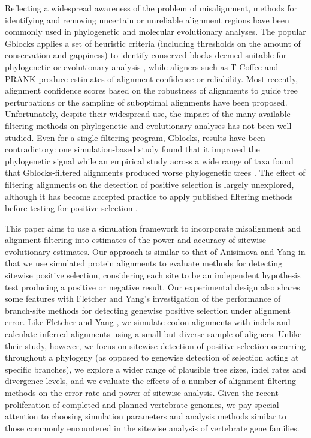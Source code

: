\documentclass{mbe}
\begin{document}
Reflecting a widespread awareness of the problem of misalignment,
methods for identifying and removing uncertain or unreliable alignment
regions have been commonly used in phylogenetic and molecular
evolutionary analyses. The popular Gblocks applies a set of heuristic
criteria (including thresholds on the amount of conservation and
gappiness) to identify conserved blocks deemed suitable for
phylogenetic or evolutionary analysis \citep{Castresana2000Selection},
while aligners such as T-Coffee \citep{Notredame2000TCoffee} and PRANK
\citep{Loytynoja2005From} produce estimates of alignment confidence or
reliability. Most recently, alignment confidence scores based on the
robustness of alignments to guide tree perturbations
\citep{Penn2010Alignment} or the sampling of suboptimal alignments
\citep{Kim2011PSAR} have been proposed. Unfortunately, despite their
widespread use, the impact of the many available filtering methods on
phylogenetic and evolutionary analyses has not been well-studied. Even
for a single filtering program, Gblocks, results have been
contradictory: one simulation-based study found that it improved the
phylogenetic signal \citep{Talavera2007Improvement} while an empirical
study across a wide range of taxa found that Gblocks-filtered
alignments produced worse phylogenetic trees
\citep{Dessimoz2010Phylogenetic}. The effect of filtering alignments
on the detection of positive selection is largely unexplored, although
it has become accepted practice to apply published filtering methods
before testing for positive selection \citep{Studer2008Pervasive,Aguileta2009Rapidly}.

This paper aims to use a simulation framework to incorporate
misalignment and alignment filtering into estimates of the power and
accuracy of sitewise evolutionary estimates. Our approach is similar
to that of Anisimova and Yang \citeyearpar{Anisimova2002Accuracy} in
that we use simulated protein alignments to evaluate methods for
detecting sitewise positive selection, considering each site to be an
independent hypothesis test producing a positive or negative
result. Our experimental design also shares some features with
Fletcher and Yang's \citeyearpar{Fletcher2010Effect} investigation of
the performance of branch-site methods for detecting genewise positive
selection under alignment error. Like Fletcher and Yang
\citeyearpar{Fletcher2010Effect}, we simulate codon alignments with
indels and calculate inferred alignments using a small but diverse
sample of aligners. Unlike their study, however, we focus on sitewise
detection of positive selection occurring throughout a phylogeny (as
opposed to genewise detection of selection acting at specific
branches), we explore a wider range of plausible tree sizes, indel
rates and divergence levels, and we evaluate the effects of a number
of alignment filtering methods on the error rate and power of sitewise
analysis. Given the recent proliferation of completed and planned
vertebrate genomes, we pay special attention to choosing simulation
parameters and analysis methods similar to those commonly encountered
in the sitewise analysis of vertebrate gene families.
\end{document}

